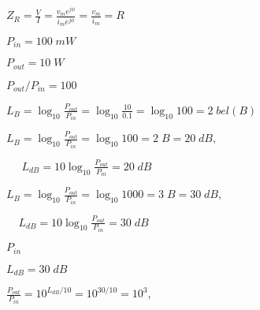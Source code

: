 \documentclass{article}
\def\lthtmlcheckvsize{\ifdim\ht\sizebox<\vsize 
  \ifdim\wd\sizebox<\hsize\expandafter\hfill\fi \expandafter\vfill
  \else\expandafter\vss\fi}%
\begin{document}
{\newpage\clearpage
{}%
$\displaystyle Z_R=\frac{V}{I}=\frac{v_me^{j\phi}}{i_me^{j\phi}}=\frac{v_m}{i_m}=R$%
\lthtmlindisplaymathZ
\lthtmlcheckvsize\clearpage}

{\newpage\clearpage
{}%
$ P_{in}=100\; mW$%
\lthtmlindisplaymathZ
\lthtmlcheckvsize\clearpage}

{\newpage\clearpage
{}%
$ P_{out}=10\;W$%
\lthtmlindisplaymathZ
\lthtmlcheckvsize\clearpage}

{\newpage\clearpage
{}%
$ P_{out}/P_{in}=100$%
\lthtmlindisplaymathZ
\lthtmlcheckvsize\clearpage}

{\newpage\clearpage
{}%
$\displaystyle L_B=\log_{10} \frac{P_{out}}{P_{in}}=\log_{10} \frac{10}{0.1} =\log_{10} 100 =2\; bel(B)$%
\lthtmlindisplaymathZ
\lthtmlcheckvsize\clearpage}

{\newpage\clearpage
{}%
$\displaystyle L_B=\log_{10}\frac{P_{out}}{P_{in}}=\log_{10} 100 =2\;B=20\;dB,
\;\;\;\;$%
\lthtmlindisplaymathZ
\lthtmlcheckvsize\clearpage}

{\newpage\clearpage
{}%
$\displaystyle \;\;\;\;\;
L_{dB}=10 \log_{10}\frac{P_{out}}{P_{in}}=20\;dB$%
\lthtmlindisplaymathZ
\lthtmlcheckvsize\clearpage}

{\newpage\clearpage
{}%
$\displaystyle L_B=\log_{10}\frac{P_{out}}{P_{in}}=\log_{10} 1000 =3\;B=30\;dB,
\;\;\;\;$%
\lthtmlindisplaymathZ
\lthtmlcheckvsize\clearpage}

{\newpage\clearpage
{}%
$\displaystyle \;\;\;\;
L_{dB}=10 \log_{10}\frac{P_{out}}{P_{in}}=30\;dB$%
\lthtmlindisplaymathZ
\lthtmlcheckvsize\clearpage}

{\newpage\clearpage
{}%
$ P_{in}$%
\lthtmlindisplaymathZ
\lthtmlcheckvsize\clearpage}

{\newpage\clearpage
{}%
$ L_{dB}=30\;dB$%
\lthtmlindisplaymathZ
\lthtmlcheckvsize\clearpage}

{\newpage\clearpage
{}%
$\displaystyle \frac{P_{out}}{P_{in}}=10^{L_{dB}/10}=10^{30/10}=10^3,
\;\;\;\;$%
\lthtmlindisplaymathZ
\lthtmlcheckvsize\clearpage}
\end{document}

